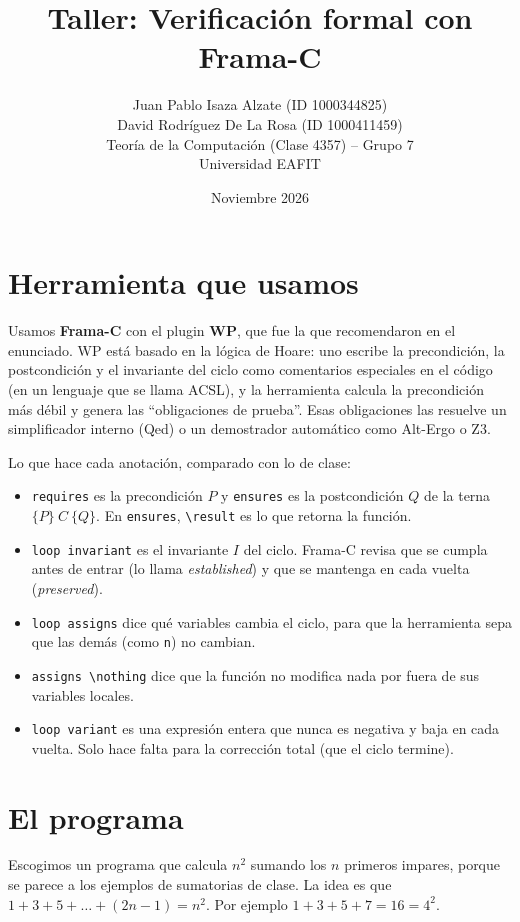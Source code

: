 \documentclass[11pt,letterpaper]{article}
\title{Taller: Verificación formal con Frama-C}
\author{Juan Pablo Isaza Alzate (ID 1000344825)\\
David Rodríguez De La Rosa (ID 1000411459)\\[0.3cm]
Teoría de la Computación (Clase 4357) -- Grupo 7\\
Universidad EAFIT}
\date{Noviembre 2026}
\newcommand{\hoare}[3]{\{#1\}\ #2\ \{#3\}}
\begin{document}
\maketitle

\section{Herramienta que usamos}

Usamos \textbf{Frama-C} con el plugin \textbf{WP}, que fue la que recomendaron en el enunciado. WP está basado en la lógica de Hoare: uno escribe la precondición, la postcondición y el invariante del ciclo como comentarios especiales en el código (en un lenguaje que se llama ACSL), y la herramienta calcula la precondición más débil y genera las ``obligaciones de prueba''. Esas obligaciones las resuelve un simplificador interno (Qed) o un demostrador automático como Alt-Ergo o Z3.

Lo que hace cada anotación, comparado con lo de clase:
\begin{itemize}
\item \texttt{requires} es la precondición $P$ y \texttt{ensures} es la postcondición $Q$ de la terna $\hoare{P}{C}{Q}$. En \texttt{ensures}, \texttt{\textbackslash result} es lo que retorna la función.
\item \texttt{loop invariant} es el invariante $I$ del ciclo. Frama-C revisa que se cumpla antes de entrar (lo llama \textit{established}) y que se mantenga en cada vuelta (\textit{preserved}).
\item \texttt{loop assigns} dice qué variables cambia el ciclo, para que la herramienta sepa que las demás (como \texttt{n}) no cambian.
\item \texttt{assigns \textbackslash nothing} dice que la función no modifica nada por fuera de sus variables locales.
\item \texttt{loop variant} es una expresión entera que nunca es negativa y baja en cada vuelta. Solo hace falta para la corrección total (que el ciclo termine).
\end{itemize}

\section{El programa}

Escogimos un programa que calcula $n^2$ sumando los $n$ primeros impares, porque se parece a los ejemplos de sumatorias de clase. La idea es que $1 + 3 + 5 + \dots + (2n-1) = n^2$. Por ejemplo $1+3+5+7 = 16 = 4^2$.
\end{document}
